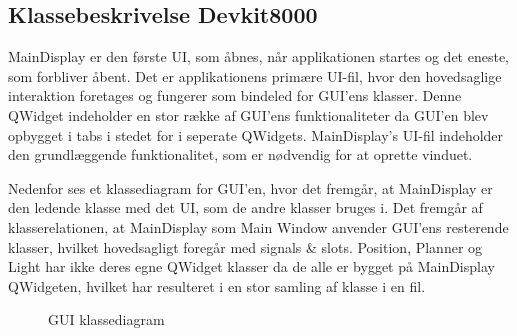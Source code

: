 \subsection{Klassebeskrivelse Devkit8000}

MainDisplay er den første UI, som åbnes, når applikationen startes og det eneste, som forbliver åbent. Det er applikationens primære UI-fil, hvor den hovedsaglige interaktion foretages og fungerer som bindeled for GUI'ens klasser. Denne QWidget indeholder en stor række af GUI'ens funktionaliteter da GUI'en blev opbygget i tabs i stedet for i seperate QWidgets. MainDisplay's UI-fil indeholder den grundlæggende funktionalitet, som er nødvendig for at oprette vinduet.
\newline

Nedenfor ses et klassediagram for GUI’en, hvor det fremgår, at MainDisplay er den ledende klasse med det UI, som de andre klasser bruges i. Det fremgår af klasserelationen, at MainDisplay som Main Window anvender GUI’ens resterende klasser, hvilket hovedsagligt foregår med signals \& slots. Position, Planner og Light har ikke deres egne QWidget klasser da de alle er bygget på MainDisplay QWidgeten, hvilket har resulteret i en stor samling af klasse i en fil.

\begin{figure}[H] \centering
    \caption{GUI klassediagram}
    \label{fig:GUI klassediagram}
\end{figure}

